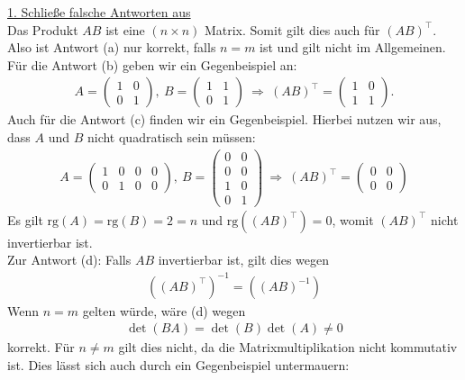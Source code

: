 \underline{1. Schließe falsche Antworten aus}\\
Das Produkt $AB$ ist eine $(n \times n)$ Matrix. 
Somit gilt dies auch für $(AB)^\top$. Also ist Antwort (a) nur korrekt, falls $n = m$ ist und gilt nicht im Allgemeinen.
Für die Antwort (b) geben wir ein Gegenbeispiel an:
\begin{align*}
	A
	= 
	\begin{pmatrix}
		1 & 0\\
		0 & 1
	\end{pmatrix},
	\
	B
	=
	\begin{pmatrix}
		1 & 1 \\
		0 & 1
	\end{pmatrix}
	\
	\Rightarrow
	\
	(AB)^\top
	= 
	\begin{pmatrix}
		1 & 0\\
		1 & 1
	\end{pmatrix}.
\end{align*}
Auch für die Antwort (c) finden wir ein Gegenbeispiel. Hierbei nutzen wir aus, dass $A$ und $B$ nicht quadratisch sein müssen:
\begin{align*}
	A
	=
	\begin{pmatrix}
		1 & 0 & 0 & 0\\
		0 & 1 & 0 & 0
	\end{pmatrix},
	\
	B =
	\begin{pmatrix}
		0 & 0 \\
		0 & 0 \\
		1 & 0 \\
		0 & 1
	\end{pmatrix}
	\
	\Rightarrow
	\
	(AB)^\top = 
	\begin{pmatrix}
		0 & 0 \\
		0 & 0
	\end{pmatrix}
\end{align*}
Es gilt $\mathrm{rg}(A) = \mathrm{rg}(B) = 2 = n$ und $\mathrm{rg}\left((AB)^\top\right) = 0$, womit $(AB)^\top$ nicht invertierbar ist.\\
Zur Antwort (d): Falls $AB$ invertierbar ist, gilt dies wegen
\begin{align*}
	\left((AB)^\top\right)^{-1} = \left((AB)^{-1}\right)
\end{align*}
Wenn $n = m $ gelten würde, wäre (d) wegen 
\begin{align*}
	\det(BA) = \det(B) \det(A) \neq 0
\end{align*}
korrekt. Für $n \neq m$ gilt dies nicht, da die Matrixmultiplikation nicht kommutativ ist. Dies lässt sich auch durch ein Gegenbeispiel untermauern:
